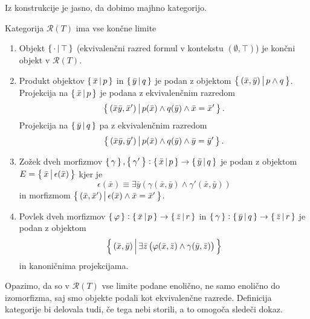 \documentclass[../kategoricna_logika.tex]{subfiles}
\begin{document}
\noindent
Iz konstrukcije je jasno, da dobimo majhno kategorijo.
\begin{lema}\label{lema:limite-v-interni-logiki}
  Kategorija $\mathcal{R}(T)$ ima vse končne limite
  \begin{enumerate}[label=(\roman*)]
    \item Objekt $\left\lbrace\,\cdot \,\middle|\, \top\,\right\rbrace$ (ekvivalenčni razred formul v kontekstu $(\emptyset, \top)$) je končni objekt v $\mathcal{R}(T)$.
    \item Produkt objektov $\left\lbrace\,\bar{x}\,\middle|\, p\,\right\rbrace$ in $\left\lbrace\,\bar{y}\,\middle|\, q\,\right\rbrace$ je podan z objektom
      $\left\lbrace\,(\bar{x},\bar{y})\,\middle|\, p \wedge q\,\right\rbrace$.
      Projekcija na $\left\lbrace\,\bar{x}\,\middle|\, p\,\right\rbrace$ je podana z ekvivalenčnim  razredom 
      $$\left\lbrace\,(\bar{x}\bar{y},\bar{x}')\,\middle|\, p(\bar{x}) \wedge q(\bar{y}) \wedge \bar{x} = \bar{x}'\,\right\rbrace.$$
      Projekcija na $\left\lbrace\,\bar{y}\,\middle|\, q\,\right\rbrace$ pa z ekvivalenčnim razredom
      $$\left\lbrace\,(\bar{x}\bar{y},\bar{y}')\,\middle|\, p(\bar{x}) \wedge q(\bar{y}) \wedge \bar{y} = \bar{y}'\,\right\rbrace.$$
    \item Zožek dveh morfizmov $\left\lbrace\,\gamma\,\right\rbrace, \left\lbrace\,\gamma'\,\right\rbrace : \left\lbrace\,\bar{x}\,\middle|\, p\,\right\rbrace \to \left\lbrace\,\bar{y}\,\middle|\, q\,\right\rbrace$
      je podan z objektom $E = \left\lbrace\,\bar{x}\,\middle|\, \epsilon(\bar{x})\,\right\rbrace$ kjer je 
      $$\epsilon(\bar{x}) \equiv \exists \bar{y}\left(\gamma(\bar{x},\bar{y}) \wedge \gamma'(\bar{x},\bar{y})\right)$$
      in morfizmom $\left\lbrace\,(\bar{x},\bar{x}')\,\middle|\, \epsilon(\bar{x}) \wedge \bar{x} = \bar{x}'\,\right\rbrace$.
    \item Povlek dveh morfizmov $\left\lbrace\,\varphi\,\right\rbrace : \left\lbrace\,\bar{x}\,\middle|\, p\,\right\rbrace \to  \left\lbrace\,\bar{z}\,\middle|\, r\,\right\rbrace$ in $\left\lbrace\,\gamma\,\right\rbrace : \left\lbrace\,\bar{y}\,\middle|\, q\,\right\rbrace \to \left\lbrace\,\bar{z}\,\middle|\, r\,\right\rbrace$
      je podan z objektom 
      $$\left\lbrace\,(\bar{x},\bar{y})\,\middle|\, \exists \bar{z} \left(\varphi(\bar{x},\bar{z}) \wedge \gamma(\bar{y},\bar{z})\right)\,\right\rbrace$$
      in kanoničnima projekcijama.
  \end{enumerate}
\end{lema}
\begin{opomba}
  Opazimo, da so v $\mathcal{R}(T)$ vse limite podane enolično, ne samo enolično do izomorfizma,
  saj smo objekte podali kot ekvivalenčne razrede. Definicija kategorije bi delovala tudi, če tega nebi storili, a to omogoča sledeči dokaz.
\end{opomba}
\end{document}
